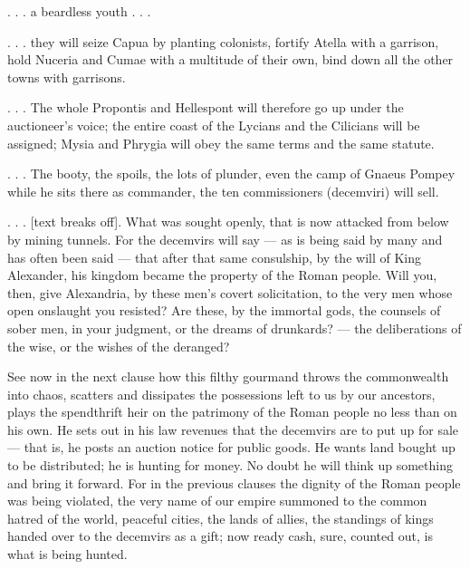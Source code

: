 %

 . . . a beardless youth . . .

 . . . they will seize Capua by planting colonists, fortify Atella with a garrison, hold Nuceria and Cumae with a multitude of their own, bind down all the other towns with garrisons.

 . . . The whole Propontis and Hellespont will therefore go up under the auctioneer's voice; the entire coast of the Lycians and the Cilicians will be assigned; Mysia and Phrygia will obey the same terms and the same statute.

 . . . The booty, the spoils, the lots of plunder, even the camp of Gnaeus Pompey while he sits there as commander, the ten commissioners (decemviri) will sell.

 . . . [text breaks off]. What was sought openly, that is now attacked from below by mining tunnels. For the decemvirs will say --- as is being said by many and has often been said --- that after that same consulship, by the will of King Alexander, his kingdom became the property of the Roman people. Will you, then, give Alexandria, by these men's covert solicitation, to the very men whose open onslaught you resisted? Are these, by the immortal gods, the counsels of sober men, in your judgment, or the dreams of drunkards? --- the deliberations of the wise, or the wishes of the deranged?

 See now in the next clause how this filthy gourmand throws the commonwealth into chaos, scatters and dissipates the possessions left to us by our ancestors, plays the spendthrift heir on the patrimony of the Roman people no less than on his own. He sets out in his law revenues that the decemvirs are to put up for sale --- that is, he posts an auction notice for public goods. He wants land bought up to be distributed; he is hunting for money. No doubt he will think up something and bring it forward. For in the previous clauses the dignity of the Roman people was being violated, the very name of our empire summoned to the common hatred of the world, peaceful cities, the lands of allies, the standings of kings handed over to the decemvirs as a gift; now ready cash, sure, counted out, is what is being hunted.

